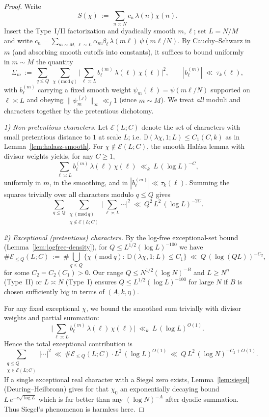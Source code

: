\documentclass[11pt]{article}
\theoremstyle{definition}
\theoremstyle{remark}
\numberwithin{equation}{part}
\begin{document}
\begin{proof}
	Write
	\[
		S(\chi)\ :=\ \sum_{n\asymp N} c_n\,\lambda(n)\chi(n).
	\]
	Insert the Type~I/II factorization and dyadically smooth $m,\ell$; set $L=N/M$ and write $c_n=\sum_{m\sim M,\ \ell\sim L} \alpha_m \beta_\ell\, \lambda(m\ell)\, \psi(m\ell/N)$.
	By Cauchy–Schwarz in $m$ (and absorbing smooth cutoffs into constants), it suffices to bound uniformly in $m\sim M$ the quantity
	\[
		\Sigma_m\ :=\ \sum_{q\le Q}\ \sum_{\chi\ (\mathrm{mod}\ q)}
		\Bigg|\sum_{\ell\asymp L} b^{(m)}_\ell\,\lambda(\ell)\,\chi(\ell)\Bigg|^2,
		\qquad |b^{(m)}_\ell|\ \ll\ \tau_k(\ell),
	\]
	with $b^{(m)}_\ell$ carrying a fixed smooth weight $\psi_m(\ell)=\psi(m\ell/N)$ supported on $\ell\asymp L$ and obeying $\|\psi_m^{(j)}\|_\infty\ll_j 1$ (since $m\sim M$). We treat \emph{all} moduli and characters together by the pretentious dichotomy.

	\smallskip
	\noindent\emph{1) Non-pretentious characters.}
	Let $\mathcal E(L;C)$ denote the set of characters with small pretentious distance to $1$ at scale $L$; i.e. $\mathbb D(\lambda\chi,1;L)\le C_1(C,k)$ as in Lemma~\ref{lem:halasz-smooth}. For $\chi\notin \mathcal E(L;C)$, the smooth Halász lemma with divisor weights yields, for any $C\ge1$,
	\[
		\sum_{\ell\asymp L} b^{(m)}_\ell\,\lambda(\ell)\,\chi(\ell)\ \ll_{k}\ L\,(\log L)^{-C},
	\]
	uniformly in $m$, in the smoothing, and in $|b^{(m)}_\ell|\ll\tau_k(\ell)$. Summing the squares trivially over all characters modulo $q\le Q$ gives
	\[
		\sum_{q\le Q}\sum_{\substack{\chi\ (\mathrm{mod}\ q)\\ \chi\notin\mathcal E(L;C)}}
		\Bigg|\sum_{\ell\asymp L} \cdots \Bigg|^2
		\ \ll\ Q^2\,L^2\,(\log L)^{-2C}.
	\]

	\smallskip
	\noindent\emph{2) Exceptional (pretentious) characters.}
	By the log-free exceptional-set bound (Lemma~\ref{lem:logfree-density}), for $Q\le L^{1/2}(\log L)^{-100}$ we have
	\[
		\#\mathcal E_{\le Q}(L;C)\ :=\ \#\bigcup_{q\le Q}\{\chi\ (\mathrm{mod}\ q):\ \mathbb D(\lambda\chi,1;L)\le C_1\}
		\ \ll\ Q\,(\log(QL))^{-C_2},
	\]
	for some $C_2=C_2(C_1)>0$. Our range $Q\le N^{1/2}(\log N)^{-B}$ and $L\ge N^{\eta}$ (Type~II) or $L\asymp N$ (Type~I) ensures $Q\le L^{1/2}(\log L)^{-100}$ for large $N$ if $B$ is chosen sufficiently big in terms of $(A,k,\eta)$.

	For any fixed exceptional $\chi$, we bound the smoothed sum trivially with divisor weights and partial summation:
	\[
		\Bigg|\sum_{\ell\asymp L} b^{(m)}_\ell\,\lambda(\ell)\,\chi(\ell)\Bigg|
		\ \ll_{k}\ L\,(\log L)^{O(1)} .
	\]
	Hence the total exceptional contribution is
	\[
		\sum_{\substack{q\le Q\\ \chi\in\mathcal E(L;C)}}\Big|\cdots\Big|^2
		\ \ll\ \#\mathcal E_{\le Q}(L;C)\cdot L^2\,(\log L)^{O(1)}
		\ \ll\ Q\,L^2\,(\log N)^{-C_2+O(1)}.
	\]
	If a single exceptional real character with a Siegel zero exists, Lemma~\ref{lem:siegel} (Deuring–Heilbronn) gives for that $\chi_0$ an exponentially decaying bound $L\,e^{-c\sqrt{\log L}}$ which is far better than any $(\log N)^{-A}$ after dyadic summation. Thus Siegel’s phenomenon is harmless here.


\end{proof}
\end{document}
